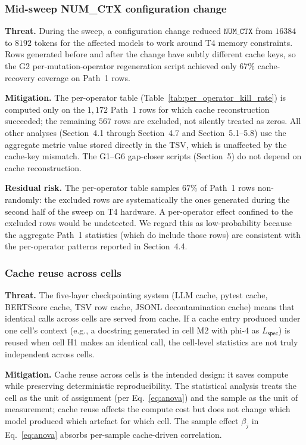 \subsubsection{Mid-sweep NUM_CTX configuration change}

\textbf{Threat.} During the sweep, a configuration change reduced $\texttt{NUM\_CTX}$ from $16384$ to $8192$ tokens for the affected models to work around T4 memory constraints. Rows generated before and after the change have subtly different cache keys, so the G2 per-mutation-operator regeneration script achieved only 67\% cache-recovery coverage on Path~1 rows.

\textbf{Mitigation.} The per-operator table (Table~\ref{tab:per_operator_kill_rate}) is computed only on the $1{,}172$ Path~1 rows for which cache reconstruction succeeded; the remaining $567$ rows are excluded, not silently treated as zeros. All other analyses (Section~4.1 through Section~4.7 and Section~5.1--5.8) use the aggregate metric value stored directly in the TSV, which is unaffected by the cache-key mismatch. The G1--G6 gap-closer scripts (Section~5) do not depend on cache reconstruction.

\textbf{Residual risk.} The per-operator table samples $67\%$ of Path~1 rows non-randomly: the excluded rows are systematically the ones generated during the second half of the sweep on T4 hardware. A per-operator effect confined to the excluded rows would be undetected. We regard this as low-probability because the aggregate Path~1 statistics (which do include those rows) are consistent with the per-operator patterns reported in Section~4.4.

\subsubsection{Cache reuse across cells}

\textbf{Threat.} The five-layer checkpointing system (LLM cache, pytest cache, BERTScore cache, TSV row cache, JSONL decontamination cache) means that identical calls across cells are served from cache. If a cache entry produced under one cell's context (e.g., a docstring generated in cell M2 with phi-4 as $L_{\textsf{spec}}$) is reused when cell H1 makes an identical call, the cell-level statistics are not truly independent across cells.

\textbf{Mitigation.} Cache reuse across cells is the intended design: it saves compute while preserving deterministic reproducibility. The statistical analysis treats the cell as the unit of assignment (per Eq.~\ref{eq:anova}) and the sample as the unit of measurement; cache reuse affects the compute cost but does not change which model produced which artefact for which cell. The sample effect $\beta_j$ in Eq.~\ref{eq:anova} absorbs per-sample cache-driven correlation.

